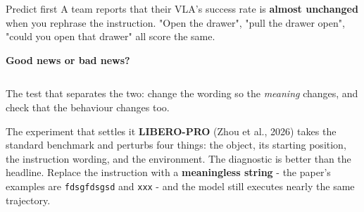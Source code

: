 \documentclass[aspectratio=169]{beamer}
\begin{document}
\begin{frame}{Predict first}
  \small
  A team reports that their VLA's success rate is \textbf{almost unchanged} when you
  rephrase the instruction. "Open the drawer", "pull the drawer open", "could you open that
  drawer" all score the same.
  \vskip 12pt
  \begin{center}
    \textbf{Good news or bad news?}
  \end{center}
  \vskip 12pt
  \pause
  \begin{columns}[T]
  \end{columns}
  \vskip 8pt
  \footnotesize
  \centering
  The test that separates the two: change the wording so the \emph{meaning} changes, and
  check that the behaviour changes too.
\end{frame}

\begin{frame}{The experiment that settles it}
  \small
  \textbf{LIBERO-PRO} (Zhou et al., 2026) takes the standard benchmark and perturbs four
  things: the object, its starting position, the instruction wording, and the environment.
  \vskip 6pt
  \vskip 8pt
  The diagnostic is better than the headline. Replace the instruction with a
  \textbf{meaningless string} - the paper's examples are \texttt{fdsgfdsgsd} and
  \texttt{xxx} - and the model still executes nearly the same trajectory.
  \vskip 8pt
  \begin{columns}[T]
  \end{columns}
\end{frame}
\end{document}
